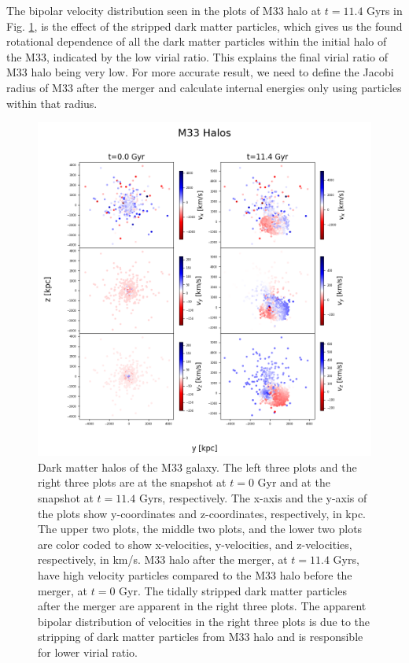 \documentclass[twocolumn]{aastex631}
\begin{document}
The bipolar velocity distribution seen in the plots of M33 halo at $t=11.4$ Gyrs in Fig. \ref{fig:halo_M33}, is the effect of the stripped dark matter particles, which gives us the found rotational dependence of all the dark matter particles within the initial halo of the M33, indicated by the low virial ratio. This explains the final virial ratio of M33 halo being very low. For more accurate result, we need to define the Jacobi radius of M33 after the merger and calculate internal energies only using particles within that radius. 

\begin{figure}[htbp]
\includegraphics[width=\textwidth]{M33.png}
\caption{Dark matter halos of the M33 galaxy. The left three plots and the right three plots are at the snapshot at $t=0$ Gyr and at the snapshot at $t=11.4$ Gyrs, respectively. The x-axis and the y-axis of the plots show y-coordinates and z-coordinates, respectively, in kpc. The upper two plots, the middle two plots, and the lower two plots are color coded to show x-velocities, y-velocities, and z-velocities, respectively, in km/s. M33 halo after the merger, at $t=11.4$ Gyrs, have high velocity particles compared to the M33 halo before the merger, at $t=0$ Gyr. The tidally stripped dark matter particles after the merger are apparent in the right three plots. The apparent bipolar distribution of velocities in the right three plots is due to the stripping of dark matter particles from M33 halo and is responsible for lower virial ratio.  
\label{fig:halo_M33}}
\end{figure}
\end{document}
